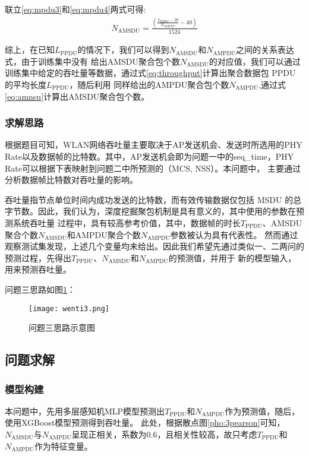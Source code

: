 \documentclass[bwprint]{gmcmthesis}
\begin{document}
联立\ref{eq:mpdu3}和\ref{eq:mpdu4}两式可得:
\begin{align}
    N_{\text{AMSDU}} = \frac{\left(\frac{L_{\text{PPDU}} - 20}{N_{\text{AMPDU}}} - 40\right)}{1524} \label{eq:amnsu}
    \end{align}

综上，在已知$L_{\text{PPDU}}$的情况下，我们可以得到$N_{\text{AMSDU}}$和$N_{\text{AMPDU}}$之间的关系表达式，由于训练集中没有
给出AMSDU聚合包个数$N_{\text{AMSDU}}$的对应值，我们可以通过训练集中给定的吞吐量等数据，通过式\ref{eq:throughput}计算出聚合数据包 PPDU 的平均长度$L_{\text{PPDU}}$，随后利用
同样给出的AMPDU聚合包个数$N_{\text{AMPDU}}$,通过式\ref{eq:amnsu}计算出AMSDU聚合包个数。

\subsubsection{求解思路}

根据题目可知，WLAN网络吞吐量主要取决于AP发送机会、发送时所选用的PHY Rate以及数据帧的比特数。其中，AP发送机会即为问题一中的seq\_time，PHY Rate可以根据下表映射到问题二中所预测的（MCS, NSS）。本问题中，
主要通过分析数据帧比特数对吞吐量的影响。

吞吐量指节点单位时间内成功发送的比特数，而有效传输数据仅包括 MSDU 的总字节数。因此，我们认为，深度挖掘聚包机制是具有意义的，其中使用的参数在预测系统吞吐量
过程中，具有较高参考价值，其中，数据帧的时长$T_{\text{PPDU}}$、AMSDU聚合个数$N_{\text{AMSDU}}$和AMPDU聚合个数$N_{\text{AMPDU}}$参数被认为具有代表性。
然而通过观察测试集发现，上述几个变量均未给出。因此我们希望先通过类似一、二两问的预测过程，先得出$T_{\text{PPDU}}$、$N_{\text{AMSDU}}$和$N_{\text{AMPDU}}$的预测值，并用于
新的模型输入，用来预测吞吐量。

问题三思路如图\ref{pho:wenti3}：
\begin{figure}[!htbp]
    \centering
    \texttt{[image: wenti3.png]}
    \caption{\centering 问题三思路示意图}
    \label{pho:wenti3}
\end{figure}

\subsection{问题求解}

\subsubsection{模型构建}

本问题中，先用多层感知机MLP模型预测出$T_{\text{PPDU}}$和$N_{\text{AMPDU}}$作为预测值，随后，使用XGBoost模型预测得到吞吐量。
此处，根据散点图\ref{pho:3pearson}可知，$N_{\text{AMSDU}}$与$N_{\text{AMPDU}}$呈现正相关，系数为0.6，且相关性较高，故只考虑$T_{\text{PPDU}}$和$N_{\text{AMPDU}}$作为特征变量。
\end{document}
